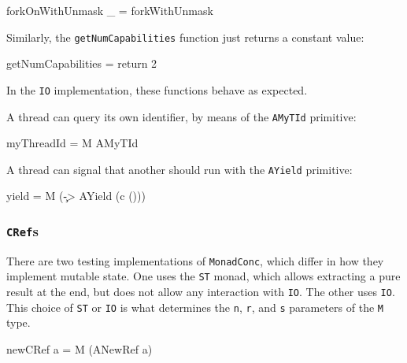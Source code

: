\begin{haskellcode}
forkOnWithUnmask _ = forkWithUnmask
\end{haskellcode}

Similarly, the \verb|getNumCapabilities| function just returns a
constant value:

\begin{haskellcode}
getNumCapabilities = return 2
\end{haskellcode}

In the \verb|IO| implementation, these functions behave as expected.

A thread can query its own identifier, by means of the \verb|AMyTId|
primitive:

\begin{haskellcode}
myThreadId = M AMyTId
\end{haskellcode}


A thread can signal that another should run with the \verb|AYield|
primitive:

\begin{haskellcode}
yield = M (\c -> AYield (c ()))
\end{haskellcode}


\subsubsection{\texttt{CRef}s}
\label{sec:execution-primops-cref}

There are two testing implementations of \verb|MonadConc|, which
differ in how they implement mutable state. One uses the \verb|ST|
monad, which allows extracting a pure result at the end, but does not
allow any interaction with \verb|IO|. The other uses \verb|IO|. This
choice of \verb|ST| or \verb|IO| is what determines the \verb|n|,
\verb|r|, and \verb|s| parameters of the \verb|M| type.

\begin{haskellcode}
newCRef a = M (ANewRef a)
\end{haskellcode}


